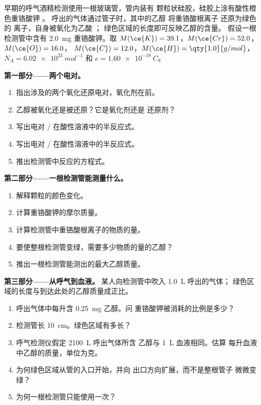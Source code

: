 \begin{problem}
\label{pb:g11:redox:1}
早期的呼气酒精检测使用一根玻璃管，管内装有
颗粒状硅胶，硅胶上涂有酸性橙色重铬酸钾 。
呼出的气体通过管子时，其中的乙醇  将重铬酸根离子
还原为绿色的  离子，自身被氧化为乙酸 ；
绿色区域的长度即可反映乙醇的含量。
假设一根检测管中含有 \qty{2.0}{mg} 重铬酸钾。取
$M(\ce{K}) = 39.1$，$M(\ce{Cr}) = 52.0$，$M(\ce{O}) = 16.0$，
$M(\ce{C}) = 12.0$，$M(\ce{H}) = \qty{1.0}{g/mol}$，$N_A =
\qty{6.02e23}{mol^{-1}}$ 和 $e = \qty{1.60e-19}{C}$。

\medskip
\noindent\textbf{第一部分——两个电对。}
\begin{enumerate}
  \item 指出涉及的两个氧化还原电对，氧化剂在前。
  \item 乙醇被氧化还是被还原？它是氧化剂还是
        还原剂？
  \item 写出电对
        / 在酸性溶液中的半反应式。
  \item 写出电对
        / 在酸性溶液中的半反应式。
  \item 推出检测管中反应的方程式。
\end{enumerate}

\medskip
\noindent\textbf{第二部分——一根检测管能测量什么。}
\begin{enumerate}[resume]
  \item 解释颗粒的颜色变化。
  \item 计算重铬酸钾的摩尔质量。
  \item 计算检测管中重铬酸根离子的物质的量。
  \item 要使整根检测管变绿，需要多少物质的量的乙醇？
  \item 推出一根检测管能测出的最大乙醇质量。
\end{enumerate}

\medskip
\noindent\textbf{第三部分——从呼气到血液。}
某人向检测管中吹入 \qty{1.0}{L} 呼出的气体；
绿色区域的长度与到达此处的乙醇质量成正比。
\begin{enumerate}[resume]
  \item 呼出气体中每升含 \qty{0.25}{mg} 乙醇。问
        重铬酸钾被消耗的比例是多少？
  \item 检测管长 \qty{10}{cm}。绿色区域有多长？
  \item 呼气检测仪假定 \qty{2100}{L} 呼出气体所含
        乙醇与 \qty{1}{L} 血液相同。估算
        每升血液中乙醇的质量，单位为克。
  \item 为何绿色区域从管的入口开始，并向
        出口方向扩展，而不是整根管子
        微微变绿？
  \item 为何一根检测管只能使用一次？
\end{enumerate}


\end{problem}
